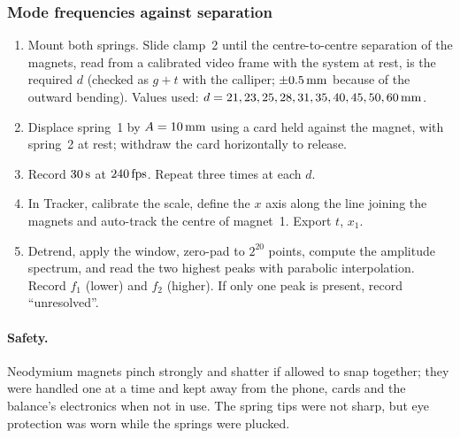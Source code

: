 \subsubsection{Mode frequencies against separation}\label{sec:mainproc}
\begin{enumerate}
\item Mount both springs. Slide clamp~2 until the centre-to-centre separation of the magnets, read from a calibrated video frame with the system at rest, is the required $d$ (checked as $g+t$ with the calliper; $\pm0.5\,\mathrm{mm}$ because of the outward bending). Values used: $d=21,23,25,28,31,35,40,45,50,60\,\mathrm{mm}$.
\item Displace spring~1 by $A=10\,\mathrm{mm}$ using a card held against the magnet, with spring~2 at rest; withdraw the card horizontally to release.
\item Record $30\,\mathrm{s}$ at $240\,\mathrm{fps}$. Repeat three times at each $d$.
\item In Tracker, calibrate the scale, define the $x$ axis along the line joining the magnets and auto-track the centre of magnet~1. Export $t$, $x_1$.
\item Detrend, apply the window, zero-pad to $2^{20}$ points, compute the amplitude spectrum, and read the two highest peaks with parabolic interpolation. Record $f_1$ (lower) and $f_2$ (higher). If only one peak is present, record ``unresolved''.
\end{enumerate}

\paragraph{Safety.} Neodymium magnets pinch strongly and shatter if allowed to snap together; they were handled one at a time and kept away from the phone, cards and the balance's electronics when not in use. The spring tips were not sharp, but eye protection was worn while the springs were plucked.
